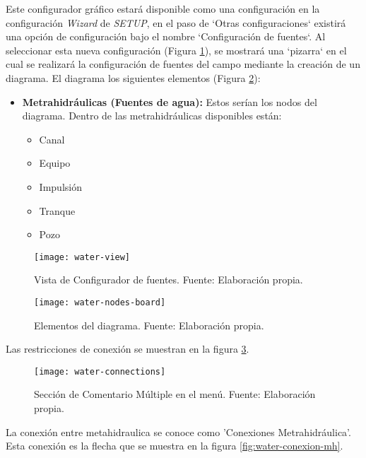 Este configurador gráfico estará disponible como una configuración en la configuración \textit{Wizard} de \textit{SETUP}, en el paso de `Otras configuraciones` existirá una opción de configuración bajo el nombre `Configuración de fuentes`.
Al seleccionar esta nueva configuración (Figura \ref{fig:water-view}), se mostrará una `pizarra` en el cual se realizará la configuración de fuentes del campo mediante la creación de un diagrama. El diagrama los siguientes elementos (Figura \ref{fig:water-nodes-board}):
\begin{itemize}
    \item \textbf{Metrahidráulicas (Fuentes de agua):} Estos serían los nodos del diagrama. Dentro de las metrahidráulicas disponibles están:
          \begin{itemize}
              \item Canal
              \item Equipo
              \item Impulsión
              \item Tranque
              \item Pozo
          \end{itemize}
    
\end{itemize}

\begin{figure}[H]
	\centering
	\texttt{[image: water-view]}
	\caption{\label{fig:water-view} Vista de Configurador de fuentes. Fuente: Elaboración propia.}
\end{figure}

\begin{figure}[H]
	\centering
	\texttt{[image: water-nodes-board]}
	\caption{\label{fig:water-nodes-board} Elementos del diagrama. Fuente: Elaboración propia.}
\end{figure}

Las restricciones de conexión se muestran en la figura \ref{fig:water-connections}.

\begin{figure}[H]
	\centering
	\texttt{[image: water-connections]}
	\caption{\label{fig:water-connections} Sección de Comentario Múltiple en el menú. Fuente: Elaboración propia.}
\end{figure}

La conexión entre metahidraulica se conoce como 'Conexiones Metrahidráulica'. Esta conexión es la flecha que se muestra en la figura \ref{fig:water-conexion-mh}.

